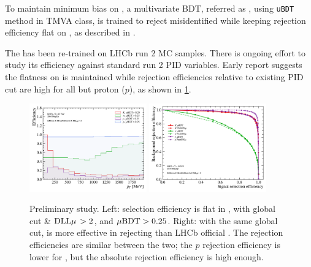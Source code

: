 To maintain minimum bias on \muon \pt, a multivariate BDT,
referred as \UBDT, using \texttt{uBDT} method in TMVA class,
is trained to reject misidentified \muon while keeping rejection
efficiency flat on \pt,
as described in \cite{LHCb-ANA-2020-056}.

The \UBDT has been re-trained on LHCb run 2 MC samples.
There is ongoing effort to study its efficiency against standard run 2 PID
variables.
Early report suggests the flatness on \pt is maintained while rejection
efficiencies relative to existing PID cut are high for all but proton ($p$),
as shown in \cref{fig:ubdt-eff}.

\begin{figure}[htb]
    \centering
    \includegraphics[width=0.45\textwidth]{./figs-selection-tech/eff_Brunel_PT_up_pidcalib_ubdt_eff.pdf}
    \hspace{1em}
    \includegraphics[width=0.45\textwidth]{./figs-selection-tech/rej_v_eff_unbiased_Brunel_PT.pdf}

    \caption{
        Preliminary \UBDT study.
        Left: \UBDT \muon selection efficiency is flat in \pt, with
        global cut \isMuon \& $\text{\PID{\muon}}\! > 2$,
        and $\mu\text{BDT} > 0.25$.
        Right: with the same global cut, \UBDT is more effective in rejecting
        \pion than LHCb official \ProbNN{\muon}.
        The \kaon rejection efficiencies are similar between the two;
        the $p$ rejection efficiency is lower for \UBDT, but the absolute
        rejection efficiency is high enough.
    }
    \label{fig:ubdt-eff}
\end{figure}
